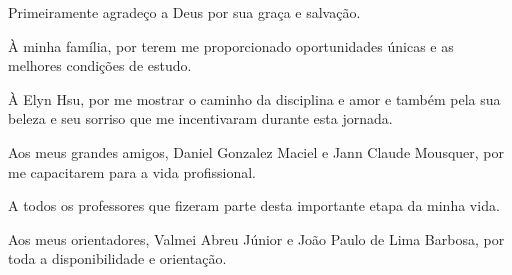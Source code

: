 \begin{agradecimentos}[AGRADECIMENTOS]
Primeiramente agradeço a Deus por sua graça e salvação.

À minha família, por terem me proporcionado oportunidades únicas e as melhores condições de estudo.

À Elyn Hsu, por me mostrar o caminho da disciplina e amor e também pela sua beleza e seu sorriso que me incentivaram durante esta jornada.

Aos meus grandes amigos, Daniel Gonzalez Maciel e Jann Claude Mousquer, por me capacitarem para a vida profissional.

A todos os professores que fizeram parte desta importante etapa da minha vida.

Aos meus orientadores, Valmei Abreu Júnior e João Paulo de Lima Barbosa, por toda a disponibilidade e orientação.


\end{agradecimentos}

